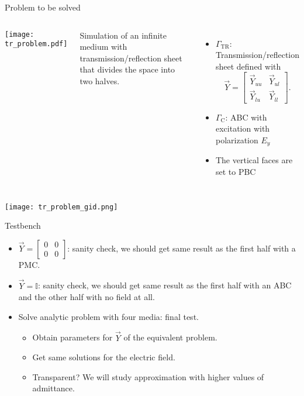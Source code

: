 \begin{frame}[allowframebreaks]{Problem to be solved}
  \begin{columns}
     \centering
    {\texttt{[image: tr\_problem.pdf]}}
    {
      Simulation of an infinite medium with transmission/reflection sheet that divides the space into two halves.
      \begin{itemize}
        \item $\Gamma_\text{TR}$: Transmission/reflection sheet defined with 
        \begin{equation*}
          \vec{Y} = \begin{bmatrix}
            \vec{Y}_{uu} & \vec{Y}_{ul} \\
            \vec{Y}_{lu} & \vec{Y}_{ll}
          \end{bmatrix}.
        \end{equation*}
        \item $\Gamma_\text{C}$: ABC with excitation with polarization $E_y$
        \item The vertical faces are set to PBC
      \end{itemize} 
    }
  \end{columns}
  \framebreak
  \texttt{[image: tr\_problem\_gid.png]}
\end{frame}

\begin{frame}{Testbench}
  \begin{itemize} 
    \item $\vec{Y} = \begin{bmatrix}
      0 & 0 \\
      0 & 0
    \end{bmatrix}$: sanity check, we should get same result as the first half with a PMC.
    \item $\vec{Y} = \mathbb{I}$: sanity check, we should get same result as the
    first half with an ABC and the other half with no field at all.
    \item Solve analytic problem with four media: final test.
    \begin{itemize}
      \item Obtain parameters for $\vec{Y}$ of the equivalent problem.
      \item Get same solutions for the electric field.
      \item Transparent? We will study approximation with higher values of admittance.
    \end{itemize}
  \end{itemize}
\end{frame}

